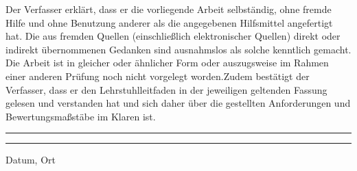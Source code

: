  Der Verfasser erklärt, dass
er die vorliegende Arbeit selbständig, ohne fremde Hilfe und ohne
Benutzung anderer als die angegebenen Hilfsmittel angefertigt hat. Die
aus fremden Quellen (einschließlich elektronischer Quellen) direkt
oder indirekt übernommenen Gedanken sind ausnahmslos als solche
kenntlich gemacht. Die Arbeit ist in gleicher oder ähnlicher Form oder
auszugsweise im Rahmen einer anderen Prüfung noch nicht vorgelegt
worden.Zudem bestätigt der Verfasser, dass er den Lehrstuhlleitfaden
in der jeweiligen geltenden Fassung gelesen und verstanden hat und
sich daher über die gestellten Anforderungen und Bewertungsmaßstäbe im
Klaren ist. \\[4cm]
\noindent\rule{5cm}{.4pt} \hfill \rule{6cm}{.4pt}

\noindent Datum, Ort \hfill \autor
